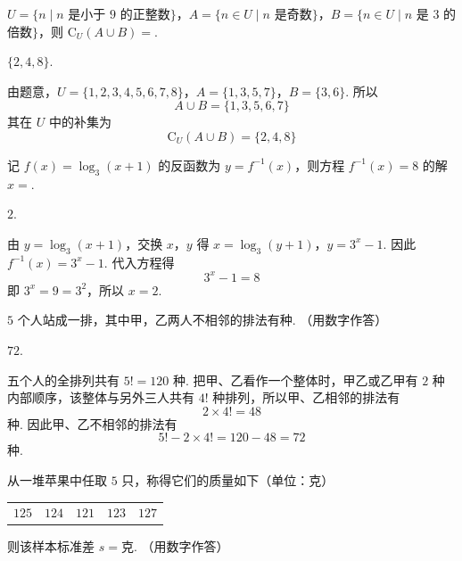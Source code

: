 \begin{problem}
\(U = \{n \mid n\) 是小于 \(9\) 的正整数\(\}\)，\(A = \{n \in U \mid n\) 是奇数\(\}\)，\(B = \{n \in U \mid n\) 是 \(3\) 的倍数\(\}\)，则 \(\mathrm{C}_U(A \cup B)=\)\fillinblank{}.
\end{problem}

\begin{answer}
\(\{2,4,8\}\).
\end{answer}

\begin{solution}
由题意，\(U=\{1,2,3,4,5,6,7,8\}\)，\(A=\{1,3,5,7\}\)，\(B=\{3,6\}\). 所以
\[
A\cup B=\{1,3,5,6,7\}
\]
其在 \(U\) 中的补集为
\[
\mathrm{C}_U(A\cup B)=\{2,4,8\}
\]
\end{solution}

\begin{problem}
记 \( f(x) = \log_{3}(x + 1) \) 的反函数为 \( y = f^{-1}(x) \)，则方程 \( f^{-1}(x) = 8 \) 的解 \( x = \)\fillinblank{}.
\end{problem}

\begin{answer}
\(2\).
\end{answer}

\begin{solution}
由 \(y=\log_3(x+1)\)，交换 \(x\)，\(y\) 得
\(x=\log_3(y+1)\)，\(y=3^x-1\).
因此 \(f^{-1}(x)=3^x-1\). 代入方程得
\[
3^x-1=8
\]
即 \(3^x=9=3^2\)，所以 \(x=2\).
\end{solution}

\begin{problem}
\(5\) 个人站成一排，其中甲，乙两人不相邻的排法有\fillinblank{}种. （用数字作答）
\end{problem}

\begin{answer}
\(72\).
\end{answer}

\begin{solution}
五个人的全排列共有 \(5!=120\) 种. 把甲、乙看作一个整体时，甲乙或乙甲有 \(2\) 种内部顺序，该整体与另外三人共有 \(4!\) 种排列，所以甲、乙相邻的排法有
\[
2\times4!=48
\]
种. 因此甲、乙不相邻的排法有
\[
5!-2\times4!=120-48=72
\]
种.
\end{solution}

\begin{problem}
从一堆苹果中任取 \(5\) 只，称得它们的质量如下（单位：\(\text{克}\)）
\begin{center}
\begin{tabular}{ccccc}
\(125\) & \(124\) & \(121\) & \(123\) & \(127\)
\end{tabular}
\end{center}
则该样本标准差 \(s =\)\fillinblank{}\(\text{克}\). （用数字作答）
\end{problem}


